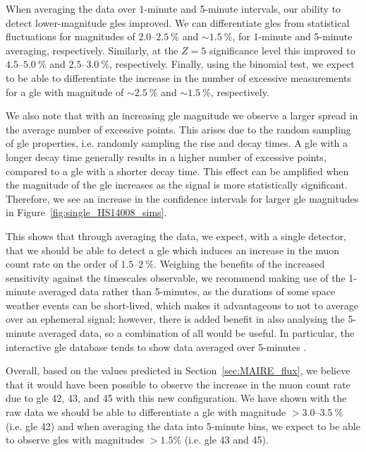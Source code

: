 When averaging the data over 1-minute and 5-minute intervals, our ability to detect lower-magnitude \glspl{gle} improved. We can differentiate \glspl{gle} from statistical fluctuations for magnitudes of $2.0$--$2.5~\%$ and $\sim$$1.5~\%$, for 1-minute and 5-minute averaging, respectively. Similarly, at the $Z=5$ significance level this improved to $4.5$--$5.0~\%$ and $2.5$--$3.0~\%$, respectively. Finally, using the binomial test, we expect to be able to differentiate the increase in the number of excessive measurements for a \gls{gle} with magnitude of $\sim$$2.5~\%$ and $\sim$$1.5~\%$, respectively.

We also note that with an increasing \gls{gle} magnitude we observe a larger spread in the average number of excessive points. This arises due to the random sampling of \gls{gle} properties, i.e. randomly sampling the rise and decay times. A \gls{gle} with a longer decay time generally results in a higher number of excessive points, compared to a \gls{gle} with a shorter decay time. This effect can be amplified when the magnitude of the \gls{gle} increases as the signal is more statistically significant. Therefore, we see an increase in the confidence intervals for larger \gls{gle} magnitudes in Figure~\ref{fig:single_HS14008_sims}.


This shows that through averaging the data, we expect, with a single detector, that we should be able to detect a \gls{gle} which induces an increase in the muon count rate on the order of $1.5$--$2~\%$. Weighing the benefits of the increased sensitivity against the timescales observable, we recommend making use of the 1-minute averaged data rather than 5-minutes, as the durations of some space weather events can be short-lived, which makes it advantageous to not to average over an ephemeral signal; however, there is added benefit in also analysing the 5-minute averaged data, so a combination of all would be useful. In particular, the interactive \gls{gle} database tends to show data averaged over 5-minutes \citep{usoskin_database_2016}.

Overall, based on the values predicted in Section~\ref{sec:MAIRE_flux}, we believe that it would have been possible to observe the increase in the muon count rate due to \gls{gle} 42, 43, and 45 with this new configuration. We have shown with the raw data we should be able to differentiate a \gls{gle} with magnitude $>3.0$--$3.5~\%$ (i.e. \gls{gle} 42) and when averaging the data into 5-minute bins, we expect to be able to observe \glspl{gle} with magnitudes $> 1.5 \%$  (i.e. \gls{gle} 43 and 45). 


